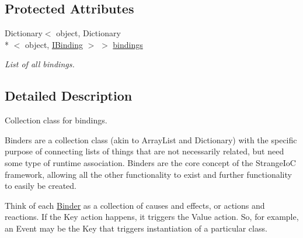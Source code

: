 \subsection*{Protected Attributes}
\begin{DoxyCompactItemize}
\item 
\hypertarget{classstrange_1_1framework_1_1impl_1_1_binder_a3b76e3cb4822c1f8732fd45fbd4d1802}{Dictionary$<$ object, Dictionary\\*
$<$ object, \hyperlink{interfacestrange_1_1framework_1_1api_1_1_i_binding}{I\-Binding} $>$ $>$ \hyperlink{classstrange_1_1framework_1_1impl_1_1_binder_a3b76e3cb4822c1f8732fd45fbd4d1802}{bindings}}\label{classstrange_1_1framework_1_1impl_1_1_binder_a3b76e3cb4822c1f8732fd45fbd4d1802}

\begin{DoxyCompactList}\small\item\em List of all bindings. \end{DoxyCompactList}\end{DoxyCompactItemize}


\subsection{Detailed Description}
Collection class for bindings. 

Binders are a collection class (akin to Array\-List and Dictionary) with the specific purpose of connecting lists of things that are not necessarily related, but need some type of runtime association. Binders are the core concept of the Strange\-Io\-C framework, allowing all the other functionality to exist and further functionality to easily be created.

Think of each \hyperlink{classstrange_1_1framework_1_1impl_1_1_binder}{Binder} as a collection of causes and effects, or actions and reactions. If the Key action happens, it triggers the Value action. So, for example, an Event may be the Key that triggers instantiation of a particular class. 

